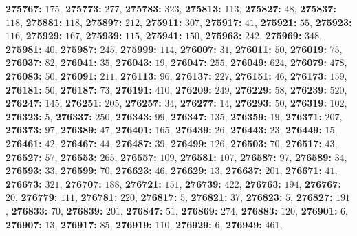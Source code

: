 \textsf{\bfseries 275767:} $175$, \textsf{\bfseries 275773:} $277$, \textsf{\bfseries 275783:} $323$, \textsf{\bfseries 275813:} $113$, \textsf{\bfseries 275827:} $48$, \textsf{\bfseries 275837:} $118$, \textsf{\bfseries 275881:} $118$, \textsf{\bfseries 275897:} $212$, \textsf{\bfseries 275911:} $307$, \textsf{\bfseries 275917:} $41$, \textsf{\bfseries 275921:} $55$, \textsf{\bfseries 275923:} $116$, \textsf{\bfseries 275929:} $167$, \textsf{\bfseries 275939:} $115$, \textsf{\bfseries 275941:} $150$, \textsf{\bfseries 275963:} $242$, \textsf{\bfseries 275969:} $348$, \textsf{\bfseries 275981:} $40$, \textsf{\bfseries 275987:} $245$, \textsf{\bfseries 275999:} $114$, \textsf{\bfseries 276007:} $31$, \textsf{\bfseries 276011:} $50$, \textsf{\bfseries 276019:} $75$, \textsf{\bfseries 276037:} $82$, \textsf{\bfseries 276041:} $35$, \textsf{\bfseries 276043:} $19$, \textsf{\bfseries 276047:} $255$, \textsf{\bfseries 276049:} $624$, \textsf{\bfseries 276079:} $478$, \textsf{\bfseries 276083:} $50$, \textsf{\bfseries 276091:} $211$, \textsf{\bfseries 276113:} $96$, \textsf{\bfseries 276137:} $227$, \textsf{\bfseries 276151:} $46$, \textsf{\bfseries 276173:} $159$, \textsf{\bfseries 276181:} $50$, \textsf{\bfseries 276187:} $73$, \textsf{\bfseries 276191:} $410$, \textsf{\bfseries 276209:} $249$, \textsf{\bfseries 276229:} $58$, \textsf{\bfseries 276239:} $520$, \textsf{\bfseries 276247:} $145$, \textsf{\bfseries 276251:} $205$, \textsf{\bfseries 276257:} $34$, \textsf{\bfseries 276277:} $14$, \textsf{\bfseries 276293:} $50$, \textsf{\bfseries 276319:} $102$, \textsf{\bfseries 276323:} $5$, \textsf{\bfseries 276337:} $250$, \textsf{\bfseries 276343:} $99$, \textsf{\bfseries 276347:} $135$, \textsf{\bfseries 276359:} $19$, \textsf{\bfseries 276371:} $207$, \textsf{\bfseries 276373:} $97$, \textsf{\bfseries 276389:} $47$, \textsf{\bfseries 276401:} $165$, \textsf{\bfseries 276439:} $26$, \textsf{\bfseries 276443:} $23$, \textsf{\bfseries 276449:} $15$, \textsf{\bfseries 276461:} $42$, \textsf{\bfseries 276467:} $44$, \textsf{\bfseries 276487:} $39$, \textsf{\bfseries 276499:} $126$, \textsf{\bfseries 276503:} $70$, \textsf{\bfseries 276517:} $43$, \textsf{\bfseries 276527:} $57$, \textsf{\bfseries 276553:} $265$, \textsf{\bfseries 276557:} $109$, \textsf{\bfseries 276581:} $107$, \textsf{\bfseries 276587:} $97$, \textsf{\bfseries 276589:} $34$, \textsf{\bfseries 276593:} $33$, \textsf{\bfseries 276599:} $70$, \textsf{\bfseries 276623:} $46$, \textsf{\bfseries 276629:} $13$, \textsf{\bfseries 276637:} $201$, \textsf{\bfseries 276671:} $41$, \textsf{\bfseries 276673:} $321$, \textsf{\bfseries 276707:} $188$, \textsf{\bfseries 276721:} $151$, \textsf{\bfseries 276739:} $422$, \textsf{\bfseries 276763:} $194$, \textsf{\bfseries 276767:} $20$, \textsf{\bfseries 276779:} $111$, \textsf{\bfseries 276781:} $220$, \textsf{\bfseries 276817:} $5$, \textsf{\bfseries 276821:} $37$, \textsf{\bfseries 276823:} $5$, \textsf{\bfseries 276827:} $191$, \textsf{\bfseries 276833:} $70$, \textsf{\bfseries 276839:} $201$, \textsf{\bfseries 276847:} $51$, \textsf{\bfseries 276869:} $274$, \textsf{\bfseries 276883:} $120$, \textsf{\bfseries 276901:} $6$, \textsf{\bfseries 276907:} $13$, \textsf{\bfseries 276917:} $85$, \textsf{\bfseries 276919:} $110$, \textsf{\bfseries 276929:} $6$, \textsf{\bfseries 276949:} $461$, 
